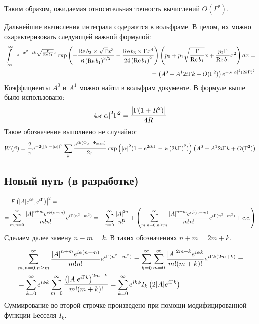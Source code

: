 \documentclass[a4paper, 12pt]{article}
\DeclareMathOperator*{\Real}{Re}
\newenvironment{eqw}{\begin{equation} \begin{aligned}}   
    {\end{aligned}    \end{equation}}
\begin{document}
Таким образом, ожидаемая относительная точность вычислений $O(\Gamma^{2})$.

Дальнейшие вычисления интеграла содержатся в вольфраме. В целом, их можно охарактеризовать следующей важной формулой:
\begin{eqw}
    \int\limits_{-\infty}^{\infty}\
    e^{-x^2 - ik\sqrt{\frac{\Gamma}{\Real b_1}}x} \exp\left(-\frac{\Real b_2 \times\sqrt{\Gamma} x^3}{6\left(\Real b_1\right)^{3/2}} - \frac{\Real b_3\times \Gamma x^4}{24\left(\Real b_1\right)^{2}} \right)
    \left(p_0 + p_1\sqrt{\frac{\Gamma}{\Real b_1}}x +\frac{p_2\Gamma}{\Real b_1}x^2\right) dx = \\
    = \left(A^0 + A^1 2i\Gamma k + O(\Gamma^2)\right) e^{-\varkappa \abs{\alpha}^2 \left(2k{\Gamma}\right)^2}
\end{eqw}
Коэффициенты $A^0$ и $A^1$ можно найти в вольфрам документе. В формуле выше было использовано:
\begin{eqw}
    4\varkappa \abs{\alpha}^2\Gamma^2 = \frac{\abs{\Gamma (1+R^2)}}{4R}
\end{eqw}
Такое обозначение выполнено не случайно:
\begin{eqw}
     W(\beta) = \frac{2}{\pi}e^{-2\left(\abs{\beta} - \abs{\alpha}\right)^2}
     \sum\limits_k \frac{e^{ik\left(\Phi_0-\Phi_{\max}\right)}}{2\pi}
     \exp\left(\abs{\alpha}^2 (1-e^{2ik\Gamma}-\varkappa \left(2k{\Gamma}\right)^2)\right) \left(A^0 + A^1 2i\Gamma k + O(\Gamma^2)\right)
\end{eqw}
\subsection*{Новый путь (в разработке)}
\begin{eqw}
     &\abs{F\left(\abs{A}e^{i\phi}, e^{i\Gamma}\right)}^2 =\\
     =&\sum_{m, n = 0}^{\infty} \frac{\abs{A}^{n+m}e^{i\phi(n-m)}}{m!n!} e^{i\Gamma(n^2 - m^2)} = -\sum_{n=0}^{\infty} \frac{\abs{A}^{2n}}{n!^2} + \left(\sum_{m, n = 0, n\ge m}^{\infty}\frac{\abs{A}^{n+m}e^{i\phi(n-m)}}{m!n!} e^{i\Gamma(n^2 - m^2)} + c.c.\right)
\end{eqw}
Сделаем далее замену $n-m=k$. В таких обозначениях $n+m = 2m+k$.

\begin{eqw}
    &\sum_{m, n = 0, n\geq m}^{\infty}\frac{\abs{A}^{n+m}e^{i\phi(n-m)}}{m!n!}e^{i\Gamma(n^2 - m^2)} = \sum_{k=0}^{\infty}\sum_{m=0}^{\infty}\frac{\abs{A}^{2m+k}e^{i\phi k}}{m!(m+k)!}e^{i\Gamma k(2m+k)} = \\
    &=\sum_{k=0}^{\infty}e^{i\phi k}\sum_{m=0}^{\infty}\frac{\left(\abs{A}e^{i\Gamma k}\right)^{2m+k}}{m!(m+k)!} = \sum_{k=0}^{\infty}e^{ik\phi}I_{k}\left(2\abs{A}e^{i\Gamma k}\right)
\end{eqw}
Суммирование во второй строчке произведено при помощи модифицированной функции Бесселя $I_k$.
\end{document}
